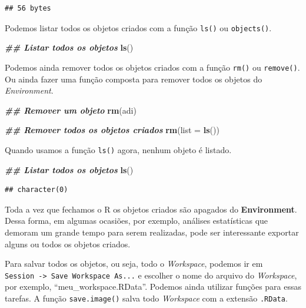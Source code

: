 \documentclass[
]{article}
\newenvironment{Shaded}{\begin{snugshade}}{\end{snugshade}}
\newcommand{\AttributeTok}[1]{\textcolor[rgb]{0.13,0.29,0.53}{#1}}
\newcommand{\DocumentationTok}[1]{\textcolor[rgb]{0.56,0.35,0.01}{\textbf{\textit{#1}}}}
\newcommand{\FunctionTok}[1]{\textcolor[rgb]{0.13,0.29,0.53}{\textbf{#1}}}
\newcommand{\NormalTok}[1]{#1}
\begin{document}
\begin{verbatim}
## 56 bytes
\end{verbatim}

Podemos listar todos os objetos criados com a função \texttt{ls()} ou \texttt{objects()}.

\begin{Shaded}
\begin{Highlighting}[]
\DocumentationTok{\#\# Listar todos os objetos}
\FunctionTok{ls}\NormalTok{()}
\end{Highlighting}
\end{Shaded}

Podemos ainda remover todos os objetos criados com a função \texttt{rm()} ou \texttt{remove()}. Ou ainda fazer uma função composta para remover todos os objetos do \emph{Environment}.

\begin{Shaded}
\begin{Highlighting}[]
\DocumentationTok{\#\# Remover um objeto}
\FunctionTok{rm}\NormalTok{(adi)}

\DocumentationTok{\#\# Remover todos os objetos criados}
\FunctionTok{rm}\NormalTok{(}\AttributeTok{list =} \FunctionTok{ls}\NormalTok{())}
\end{Highlighting}
\end{Shaded}

Quando usamos a função \texttt{ls()} agora, nenhum objeto é listado.

\begin{Shaded}
\begin{Highlighting}[]
\DocumentationTok{\#\# Listar todos os objetos}
\FunctionTok{ls}\NormalTok{()}
\end{Highlighting}
\end{Shaded}

\begin{verbatim}
## character(0)
\end{verbatim}

Toda a vez que fechamos o R os objetos criados são apagados do \textbf{Environment}. Dessa forma, em algumas ocasiões, por exemplo, análises estatísticas que demoram um grande tempo para serem realizadas, pode ser interessante exportar alguns ou todos os objetos criados.

Para salvar todos os objetos, ou seja, todo o \emph{Workspace}, podemos ir em \texttt{Session\ -\textgreater{}\ Save\ Workspace\ As...} e escolher o nome do arquivo do \emph{Workspace}, por exemplo, ``meu\_workspace.RData''. Podemos ainda utilizar funções para essas tarefas. A função \texttt{save.image()} salva todo \emph{Workspace} com a extensão \texttt{.RData}.
\end{document}
